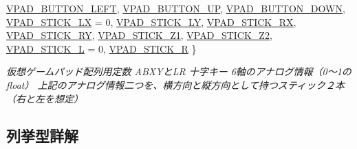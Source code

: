 \begin{DoxyCompactItemize}
\mbox{\hyperlink{namespace_k___input_a2a6df758ee5a36c29d234fe7a27beb2ca25b55a4701feef58c43d9372bd6e4e1e}{V\+P\+A\+D\+\_\+\+B\+U\+T\+T\+O\+N\+\_\+\+L\+E\+FT}}, 
\mbox{\hyperlink{namespace_k___input_a2a6df758ee5a36c29d234fe7a27beb2ca729a8422ad8afd7439f1b8762537dbf5}{V\+P\+A\+D\+\_\+\+B\+U\+T\+T\+O\+N\+\_\+\+UP}}, 
\mbox{\hyperlink{namespace_k___input_a2a6df758ee5a36c29d234fe7a27beb2ca9fe0f4572d3b923713e350e1c271ca81}{V\+P\+A\+D\+\_\+\+B\+U\+T\+T\+O\+N\+\_\+\+D\+O\+WN}}, 
\newline
\mbox{\hyperlink{namespace_k___input_a2a6df758ee5a36c29d234fe7a27beb2cae0700e4b205966281235d17f234daae2}{V\+P\+A\+D\+\_\+\+S\+T\+I\+C\+K\+\_\+\+LX}} = 0, 
\mbox{\hyperlink{namespace_k___input_a2a6df758ee5a36c29d234fe7a27beb2cae850d5e75b4b807cb016057d61a70a25}{V\+P\+A\+D\+\_\+\+S\+T\+I\+C\+K\+\_\+\+LY}}, 
\mbox{\hyperlink{namespace_k___input_a2a6df758ee5a36c29d234fe7a27beb2ca86b74335ded0e578d57fa0cf5bd5be0b}{V\+P\+A\+D\+\_\+\+S\+T\+I\+C\+K\+\_\+\+RX}}, 
\mbox{\hyperlink{namespace_k___input_a2a6df758ee5a36c29d234fe7a27beb2ca5de239acf096674e8e6e77fef14ac830}{V\+P\+A\+D\+\_\+\+S\+T\+I\+C\+K\+\_\+\+RY}}, 
\newline
\mbox{\hyperlink{namespace_k___input_a2a6df758ee5a36c29d234fe7a27beb2cae1f0e476305e4475b62fa802d2b34f84}{V\+P\+A\+D\+\_\+\+S\+T\+I\+C\+K\+\_\+\+Z1}}, 
\mbox{\hyperlink{namespace_k___input_a2a6df758ee5a36c29d234fe7a27beb2cab8d5eb379665b8a590899a27d68f4e87}{V\+P\+A\+D\+\_\+\+S\+T\+I\+C\+K\+\_\+\+Z2}}, 
\mbox{\hyperlink{namespace_k___input_a2a6df758ee5a36c29d234fe7a27beb2ca554b4642b6eb485219a03e75f05dc02e}{V\+P\+A\+D\+\_\+\+S\+T\+I\+C\+K\+\_\+L}} = 0, 
\mbox{\hyperlink{namespace_k___input_a2a6df758ee5a36c29d234fe7a27beb2ca4e48b3fdb996985d59f38dbd83645ba8}{V\+P\+A\+D\+\_\+\+S\+T\+I\+C\+K\+\_\+R}}
 \}
\begin{DoxyCompactList}\small\item\em 仮想ゲームパッド配列用定数 A\+B\+X\+Yと\+LR 十字キー 6軸のアナログ情報（0〜1のfloat） 上記のアナログ情報二つを、横方向と縦方向として持つスティック２本（右と左を想定） \end{DoxyCompactList}\end{DoxyCompactItemize}


\subsection{列挙型詳解}
\mbox{\label{namespace_k___input_a40d9e9d1b36fc009c2293f235001f9e3}} 
